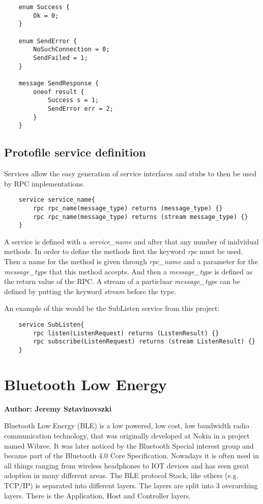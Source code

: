 \begin{verbatim}
    enum Success {
        Ok = 0;
    }

    enum SendError {
        NoSuchConnection = 0;
        SendFailed = 1;
    }

    message SendResponse {
        oneof result {
            Success s = 1;
            SendError err = 2;
        }
    }
\end{verbatim}

\subsection{Protofile service definition}

Services allow the easy generation of service interfaces and stubs to then be used by RPC implementations.

\begin{verbatim}
    service service_name{
        rpc rpc_name(message_type) returns (message_type) {}
        rpc rpc_name(message_type) returns (stream message_type) {}
    }
\end{verbatim}

A service is defined with a \textit{service\_name} and after that any number of inidvidual methods. In order to define the methods first the keyword \textit{rpc} must be used.
Then a name for the method is given through \textit{rpc\_name} and a parameter for the \textit{message\_type} that this method accepts. And then a \textit{message\_type}
is defined as the return value of the RPC. A stream of a particluar \textit{message\_type} can be defined by putting the keyword \textit{stream} before the type.

An example of this would be the SubListen service from this project:

\begin{verbatim}
    service SubListen{
        rpc listen(ListenRequest) returns (ListenResult) {}
        rpc subscribe(ListenRequest) returns (stream ListenResult) {}
    }
\end{verbatim}

\section{Bluetooth Low Energy}
\textbf{Author: Jeremy Sztavinovszki}

Bluetooth Low Energy (BLE) is a low powered, low cost, low bandwidth radio communication technology, that was originally developed at Nokia in a project named Wibree. It was later noticed by the Bluetooth Special interest group and became part of the Bluetooth 4.0 Core Specification. Nowadays it is often used in all things ranging from wireless headphones to IOT devices and has seen great adoption in many different areas. The BLE protocol Stack, like others (e.g. TCP/IP) is separated into different layers. The layers are split into 3 overarching layers. There is the Application, Host and Controller layers.

